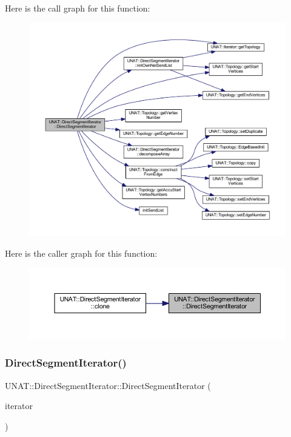 Here is the call graph for this function\+:
\nopagebreak
\begin{figure}[H]
\begin{center}
\leavevmode
\includegraphics[width=350pt]{classUNAT_1_1DirectSegmentIterator_acf8859148e589468d895eccec1f693a4_cgraph}
\end{center}
\end{figure}
Here is the caller graph for this function\+:
\nopagebreak
\begin{figure}[H]
\begin{center}
\leavevmode
\includegraphics[width=350pt]{classUNAT_1_1DirectSegmentIterator_acf8859148e589468d895eccec1f693a4_icgraph}
\end{center}
\end{figure}
\mbox{\label{classUNAT_1_1DirectSegmentIterator_a7fc34e551631ed24ca7d877371352c2a}} 
\subsubsection{\texorpdfstring{DirectSegmentIterator()}{DirectSegmentIterator()}\hspace{0.1cm}{\footnotesize\ttfamily [2/4]}}
{\footnotesize\ttfamily U\+N\+A\+T\+::\+Direct\+Segment\+Iterator\+::\+Direct\+Segment\+Iterator (\begin{DoxyParamCaption}\item[{const \mbox{\hyperlink{classUNAT_1_1DirectSegmentIterator}{Direct\+Segment\+Iterator}} \&}]{iterator }\end{DoxyParamCaption})}

